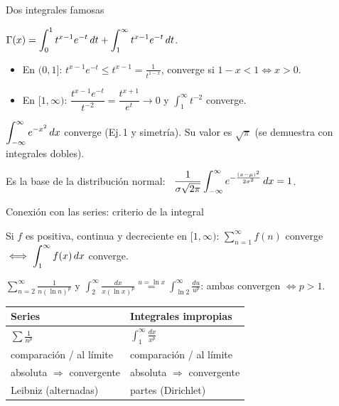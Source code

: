 \documentclass[10pt,aspectratio=169]{beamer}
\begin{document}
\begin{frame}{Dos integrales famosas}
  \begin{ejemplo}
    $\displaystyle\Gamma(x)=\int_0^1t^{x-1}e^{-t}\,dt+\int_1^\infty t^{x-1}e^{-t}\,dt$.
    \begin{itemize}
      \item En $(0,1]$: $t^{x-1}e^{-t}\le t^{x-1}=\frac{1}{t^{1-x}}$, converge si $1-x<1\iff x>0$.
      \item En $[1,\infty)$: $\dfrac{t^{x-1}e^{-t}}{t^{-2}}=\dfrac{t^{x+1}}{e^t}\to0$ y $\int_1^\infty t^{-2}$ converge.
    \end{itemize}
  \end{ejemplo}
  \begin{ejemplo}
    $\displaystyle\int_{-\infty}^\infty e^{-x^2}\,dx$ converge (Ej.\,1 y simetría). Su valor es $\sqrt\pi$ (se demuestra con integrales dobles).
    \smallskip

    Es la base de la distribución normal: \ $\displaystyle\frac{1}{\sigma\sqrt{2\pi}}\int_{-\infty}^\infty e^{-\frac{(x-\mu)^2}{2\sigma^2}}\,dx=1$.
  \end{ejemplo}
\end{frame}

\begin{frame}{Conexión con las series: criterio de la integral}
  \begin{teorema}[recordatorio]
    Si $f$ es positiva, continua y decreciente en $[1,\infty)$:
    \quad $\displaystyle\sum_{n=1}^\infty f(n)$ converge $\iff\displaystyle\int_1^\infty f(x)\,dx$ converge.
  \end{teorema}
  \begin{ejemplo}[17]
    $\displaystyle\sum_{n=2}^\infty\frac{1}{n(\ln n)^p}$ y $\displaystyle\int_2^\infty\frac{dx}{x(\ln x)^p}\overset{u=\ln x}{=}\int_{\ln2}^\infty\frac{du}{u^p}$:
    ambas convergen $\iff p>1$.
  \end{ejemplo}
  \begin{center}
    \renewcommand{\arraystretch}{1.4}
    \begin{tabular}{l|l}
      \textbf{Series} & \textbf{Integrales impropias}\\ \hline
      $\sum\frac1{n^p}$ & $\int_1^\infty\frac{dx}{x^p}$\\
      comparación / al límite & comparación / al límite\\
      absoluta $\Rightarrow$ convergente & absoluta $\Rightarrow$ convergente\\
      Leibniz (alternadas) & partes (Dirichlet)
    \end{tabular}
  \end{center}
\end{frame}
\end{document}
